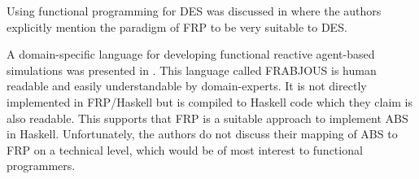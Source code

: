 Using functional programming for DES was discussed in \cite{jankovic_functional_2007} where the authors explicitly mention the paradigm of FRP to be very suitable to DES.

A domain-specific language for developing functional reactive agent-based simulations was presented in \cite{schneider_towards_2012, vendrov_frabjous:_2014}. This language called FRABJOUS is human readable and easily understandable by domain-experts. It is not directly implemented in FRP/Haskell but is compiled to Haskell code which they claim is also readable. This supports that FRP is a suitable approach to implement ABS in Haskell. Unfortunately, the authors do not discuss their mapping of ABS to FRP on a technical level, which would be of most interest to functional programmers.